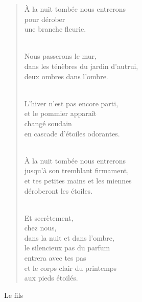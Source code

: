 \documentclass[11pt,a4paper]{book}
\begin{document}
\begin{verse}
À la nuit tombée nous entrerons \\
pour dérober \\
une branche fleurie. \\ \

Nous passerons le mur, \\
dans les ténèbres du jardin d'autrui, \\
deux ombres dans l'ombre. \\ \

L'hiver n'est pas encore parti, \\
et le pommier apparaît \\
changé soudain \\
en cascade d'étoiles odorantes. \\ \

À la nuit tombée nous entrerons \\
jusqu'à son tremblant firmament, \\
et tes petites mains et les miennes \\
déroberont les étoiles. \\ \

Et secrètement, \\
chez nous, \\
dans la nuit et dans l'ombre, \\
le silencieux pas du parfum \\
entrera avec tes pas \\
et le corps clair du printemps \\
aux pieds étoilés.
\end{verse}

\newpage

{\huge Le fils} \\ \\
\end{document}
